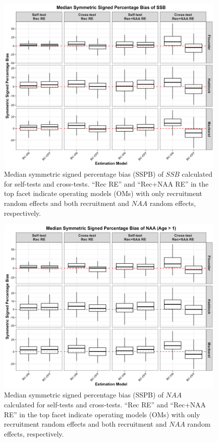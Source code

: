 \documentclass[
  12pt,
]{article}
\begin{document}
\begin{figure}[H]
    \centering
    \includegraphics[width=\textwidth]{Revised_Figures&Tables/Median_SSB_SSPB.PNG}
    \caption{Median symmetric signed percentage bias (SSPB) of $SSB$ calculated for self-tests and cross-tests. ``Rec RE'' and ``Rec+NAA RE'' in the top facet indicate operating models (OMs) with only recruitment random effects and both recruitment and $NAA$ random effects, respectively.}
    \label{fig:supp_SSB_SSPB}
\end{figure}

\begin{figure}[H]
    \centering
    \includegraphics[width=\textwidth]{Revised_Figures&Tables/Median_NAA_SSPB.PNG}
    \caption{Median symmetric signed percentage bias (SSPB) of $NAA$ calculated for self-tests and cross-tests. ``Rec RE'' and ``Rec+NAA RE'' in the top facet indicate operating models (OMs) with only recruitment random effects and both recruitment and $NAA$ random effects, respectively.}
    \label{fig:supp_NAA_SSPB}
\end{figure}
\end{document}
